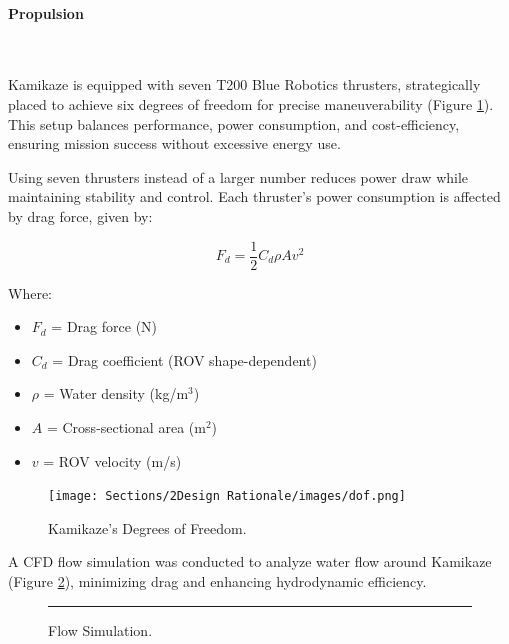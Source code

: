 \vspace{-0.3cm}
\paragraph{Propulsion} \ \\
\vspace{-0.5cm}

Kamikaze is equipped with seven T200 Blue Robotics thrusters, strategically placed to achieve six degrees of freedom for precise maneuverability (Figure \ref{fig:dof}). This setup balances performance, power consumption, and cost-efficiency, ensuring mission success without excessive energy use.

\hspace{10pt} Using seven thrusters instead of a larger number reduces power draw while maintaining stability and control. Each thruster's power consumption is affected by drag force, given by:

\begin{equation}
    F_d = \frac{1}{2} C_d \rho A v^2
    \label{eq:drag_force}
\end{equation}

Where:

\vspace{-0.5\baselineskip}
\begin{itemize}
    \setlength{\itemsep}{0pt}
    \item \(F_d\) = Drag force (N)
    \item \(C_d\) = Drag coefficient (ROV shape-dependent)
    \item \(\rho\) = Water density (kg/m\(^3\))
    \item \(A\) = Cross-sectional area (m\(^2\))
    \item \(v\) = ROV velocity (m/s)
\end{itemize}

\begin{figure}[h]
    \centering
    \texttt{[image: Sections/2Design Rationale/images/dof.png]}
    \caption{Kamikaze’s Degrees of Freedom.}
    \label{fig:dof}
\end{figure}

A CFD flow simulation was conducted to analyze water flow around Kamikaze (Figure \ref{fig:cfd}), minimizing drag and enhancing hydrodynamic efficiency.

\begin{figure}[b]
    \centering
    \rule{0.8\columnwidth}{4cm}
    \caption{Flow Simulation.}
    \label{fig:cfd}
\end{figure}

